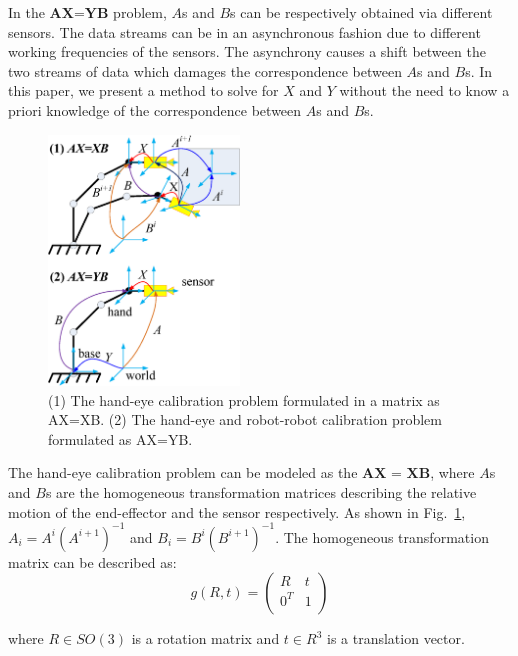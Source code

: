 \documentclass[conference,letterpaper]{IEEEtran}
\begin{document}
In the $\textbf{AX=YB}$ problem, $A$s and $B$s can be respectively obtained via different sensors. The data streams can be in an asynchronous fashion due to different working frequencies of the sensors. The asynchrony causes a shift between the two streams of data which damages the correspondence between $A$s and $B$s. In this paper, we present a method to solve for $X$ and $Y$ without the need to know a priori knowledge of the correspondence between $A$s and $B$s.

\begin{center}
\begin{figure}[htbp]
\centering
\includegraphics[width=2in]{fig1.eps}
\caption{
(1) The hand-eye calibration problem formulated in a matrix as AX=XB. (2) The hand-eye and robot-robot calibration problem formulated as AX=YB.
}
\label{fig1}
\end{figure}
\end{center}

The hand-eye calibration problem can be modeled as the $\textbf{AX = XB}$, where $A$s and $B$s are the homogeneous transformation matrices describing the relative motion of the end-effector and the sensor respectively. As shown in Fig.~\ref{fig1}, $A_{i} = A^{i}(A^{i+1})^{-1}$ and $B_{i} = B^{i}(B^{i+1})^{-1}$. The homogeneous transformation matrix can be described as:
\begin{equation}\label{equ0}
    g(R,t)=\left(
             \begin{array}{cc}
               R & t \\
               0^{T} & 1 \\
             \end{array}
           \right)
\end{equation}

where $R \in SO(3)$ is a rotation matrix and $t \in R^{3}$ is a translation vector.
\end{document}
